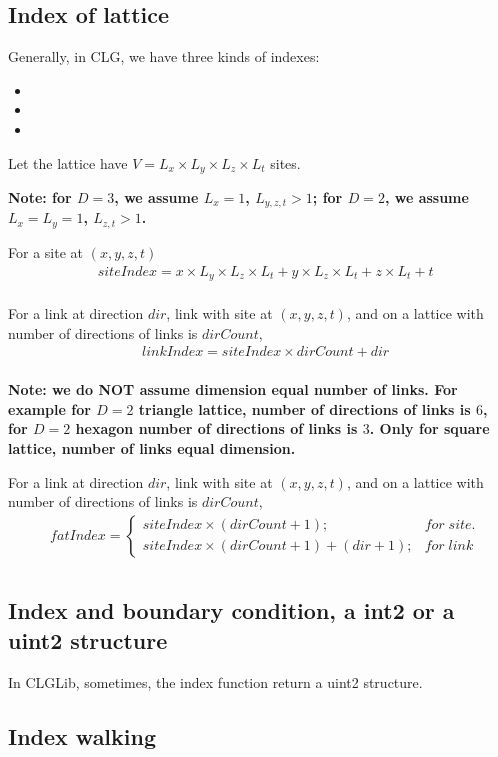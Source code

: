 \subsection{\label{index}Index of lattice}

Generally, in CLG, we have three kinds of indexes:

\begin{itemize}
\item {}
\item {}
\item {}
\end{itemize}

Let the lattice have $V = L_x\times L_y\times L_z\times L_t$ sites.

\textcolor[rgb]{1,0,0}{\bf Note: for $D=3$, we assume $L_x=1$, $L_{y,z,t}>1$; for $D=2$, we assume $L_x=L_y=1$, $L_{z,t}>1$. }

For a site at $(x,y,z,t)$
\begin{equation}
\begin{split}
&siteIndex=x\times L_y\times L_z\times L_t+y\times L_z\times L_t+z\times L_t+t\\
\end{split}
\end{equation}

For a link at direction $dir$, link with site at $(x,y,z,t)$, and on a lattice with number of directions of links is $dirCount$,
\begin{equation}
\begin{split}
&linkIndex=siteIndex\times dirCount+dir\\
\end{split}
\end{equation}

\textcolor[rgb]{1,0,0}{\bf Note: we do NOT assume dimension equal number of links. For example for $D=2$ triangle lattice, number of directions of links is $6$, for $D=2$ hexagon number of directions of links is $3$. Only for square lattice, number of links equal dimension.}

For a link at direction $dir$, link with site at $(x,y,z,t)$, and on a lattice with number of directions of links is $dirCount$,
\begin{equation}
\begin{split}
&fatIndex=\left\{\begin{array}{cc}siteIndex\times (dirCount+1);&for\;site.\\ siteIndex\times (dirCount+1)+(dir+1);&for\;link\end{array}\right.\\
\end{split}
\end{equation}

\subsection{\label{index}Index and boundary condition, a int2 or a uint2 structure}

In CLGLib, sometimes, the index function return a uint2 structure.


\subsection{\label{index}Index walking}

